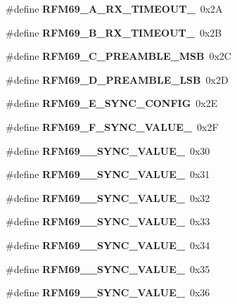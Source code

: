 \begin{DoxyCompactItemize}
\mbox{\label{_r_f_m69__registri_8h_af62e5cbd477f7cb9047dc4174ef3fd68}} 
\#define {\bfseries R\+F\+M69\+\_\+A\+\_\+\+R\+X\+\_\+\+T\+I\+M\+E\+O\+U\+T\+\_}~0x2A
\item 
\mbox{\label{_r_f_m69__registri_8h_a5e14e523a1d2eab3242d27ffc7155cee}} 
\#define {\bfseries R\+F\+M69\+\_\+B\+\_\+\+R\+X\+\_\+\+T\+I\+M\+E\+O\+U\+T\+\_}~0x2B
\item 
\mbox{\label{_r_f_m69__registri_8h_aa07d4a86e035f7b2f6d0ed287702b53b}} 
\#define {\bfseries R\+F\+M69\+\_\+C\+\_\+\+P\+R\+E\+A\+M\+B\+L\+E\+\_\+\+M\+SB}~0x2C
\item 
\mbox{\label{_r_f_m69__registri_8h_a30429968e68e895c6b22ae0033bc779c}} 
\#define {\bfseries R\+F\+M69\+\_\+D\+\_\+\+P\+R\+E\+A\+M\+B\+L\+E\+\_\+\+L\+SB}~0x2D
\item 
\mbox{\label{_r_f_m69__registri_8h_a34544e4d513d63780f2c84f32c69bafc}} 
\#define {\bfseries R\+F\+M69\+\_\+E\+\_\+\+S\+Y\+N\+C\+\_\+\+C\+O\+N\+F\+IG}~0x2E
\item 
\mbox{\label{_r_f_m69__registri_8h_a73dbb99795060b683a433d6ebeefd3ab}} 
\#define {\bfseries R\+F\+M69\+\_\+F\+\_\+\+S\+Y\+N\+C\+\_\+\+V\+A\+L\+U\+E\+\_}~0x2F
\item 
\mbox{\label{_r_f_m69__registri_8h_ac47c271c5d13eb39d307f1a9553a37d3}} 
\#define {\bfseries R\+F\+M69\+\_\+\_\+\+S\+Y\+N\+C\+\_\+\+V\+A\+L\+U\+E\+\_}~0x30
\item 
\mbox{\label{_r_f_m69__registri_8h_a32a1ac893692f6313726fb42e9b94a42}} 
\#define {\bfseries R\+F\+M69\+\_\+\_\+\+S\+Y\+N\+C\+\_\+\+V\+A\+L\+U\+E\+\_}~0x31
\item 
\mbox{\label{_r_f_m69__registri_8h_aba71143eda7113f18d91ea51e37946f1}} 
\#define {\bfseries R\+F\+M69\+\_\+\_\+\+S\+Y\+N\+C\+\_\+\+V\+A\+L\+U\+E\+\_}~0x32
\item 
\mbox{\label{_r_f_m69__registri_8h_a380909750d489a09b98c4199a0c38dc1}} 
\#define {\bfseries R\+F\+M69\+\_\+\_\+\+S\+Y\+N\+C\+\_\+\+V\+A\+L\+U\+E\+\_}~0x33
\item 
\mbox{\label{_r_f_m69__registri_8h_afecb7ffd51810a200cc733dcdfb531fc}} 
\#define {\bfseries R\+F\+M69\+\_\+\_\+\+S\+Y\+N\+C\+\_\+\+V\+A\+L\+U\+E\+\_}~0x34
\item 
\mbox{\label{_r_f_m69__registri_8h_a7fd1ef0834f51a028af7b90f5f38c167}} 
\#define {\bfseries R\+F\+M69\+\_\+\_\+\+S\+Y\+N\+C\+\_\+\+V\+A\+L\+U\+E\+\_}~0x35
\item 
\mbox{\label{_r_f_m69__registri_8h_aa8cbcd723ef32f36637af54411b5ce8b}} 
\#define {\bfseries R\+F\+M69\+\_\+\_\+\+S\+Y\+N\+C\+\_\+\+V\+A\+L\+U\+E\+\_}~0x36

\end{DoxyCompactItemize}
